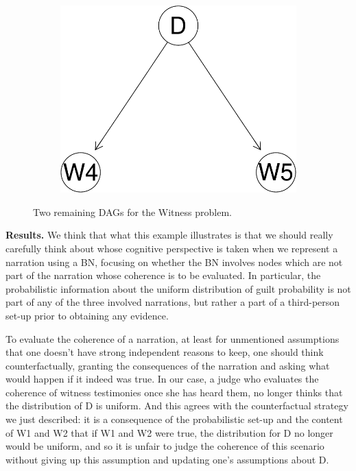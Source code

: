 \documentclass[
  10pt,
]{scrartcl}
\begin{document}
\begin{figure}[H]
{\begin{subfigure}[!ht]{0.4\textwidth}
\begin{center}\includegraphics[width=1\linewidth]{coherencePaper32_files/figure-latex/unnamed-chunk-30-1} \end{center}
\end{subfigure}}
\caption{Two remaining DAGs for the \textsf{Witness} problem.}
\label{fig:witness}
\end{figure}

\textbf{Results.} We think that what this example illustrates is that we should really carefully think about whose cognitive perspective is taken when we represent a narration using a BN, focusing on whether the BN involves nodes which are not part of the narration whose coherence is to be evaluated. In particular, the probabilistic information about the uniform distribution of guilt probability is not part of any of the three involved narrations, but rather a part of a third-person set-up prior to obtaining any evidence.

To evaluate the coherence of a narration, at least for unmentioned assumptions that one doesn't have strong independent reasons to keep, one should think counterfactually, granting the consequences of the narration and asking what would happen if it indeed was true. In our case, a judge who evaluates the coherence of witness testimonies once she has heard them, no longer thinks that the distribution of \textsf{D} is uniform. And this agrees with the counterfactual strategy we just described: it is a consequence of the probabilistic set-up and the content of \textsf{W1} and \textsf{W2} that if \textsf{W1} and \textsf{W2} were true, the distribution for \textsf{D} no longer would be uniform, and so it is unfair to judge the coherence of this scenario without giving up this assumption and updating one's assumptions about \textsf{D}.
\end{document}
